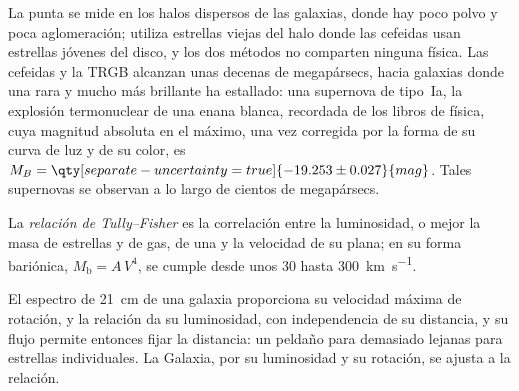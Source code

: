 La punta se mide en los halos dispersos de las galaxias, donde hay
poco polvo y poca aglomeración; utiliza estrellas viejas del halo donde las cefeidas usan
estrellas jóvenes del disco, y los dos métodos no comparten ninguna física. Las cefeidas y la
TRGB alcanzan unas decenas de megapársecs, hacia galaxias donde una  rara y mucho más
brillante ha estallado: una supernova de tipo~Ia, la
explosión termonuclear de una enana blanca, recordada de los libros de física,
cuya magnitud absoluta en el máximo, una vez corregida por la
forma de su curva de luz y de su color, es
$M_B = \qty[separate-uncertainty=true]{-19.253 \pm 0.027}{mag}$. Tales
supernovas se observan a lo largo de cientos de megapársecs.

\begin{definition}\label{def:b3:milky-way-galaxies:tully-fisher}
La \emph{relación de Tully--Fisher} es la
correlación entre la luminosidad, o mejor la masa de estrellas y de gas,
de una  y la velocidad de su  plana; en su
forma bariónica, $M_\mathrm{b} = A\,V^4$, se cumple desde unos 30 hasta
\qty{300}{km.s^{-1}}.
\end{definition}

El espectro de 21~cm de una galaxia proporciona su velocidad máxima de rotación, y la
relación da su luminosidad, con independencia de su distancia, y su flujo
permite entonces fijar la distancia: un peldaño para  demasiado lejanas para
estrellas individuales. La Galaxia, por su luminosidad y su rotación, se ajusta a la relación.

